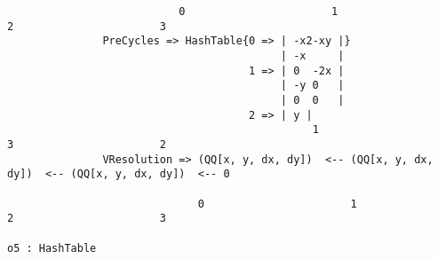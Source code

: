 \documentclass{article}
\begin{document}
\begin{flushleft}
{\begin{verbatim}
                           0                       1                       2                       3
               PreCycles => HashTable{0 => | -x2-xy |}
                                           | -x     |
                                      1 => | 0  -2x |
                                           | -y 0   |
                                           | 0  0   |
                                      2 => | y |
                                                1                       3                       2
               VResolution => (QQ[x, y, dx, dy])  <-- (QQ[x, y, dx, dy])  <-- (QQ[x, y, dx, dy])  <-- 0
                                                                                                       
                              0                       1                       2                       3

o5 : HashTable

\end{verbatim}
}

\end{flushleft}
\end{document}
